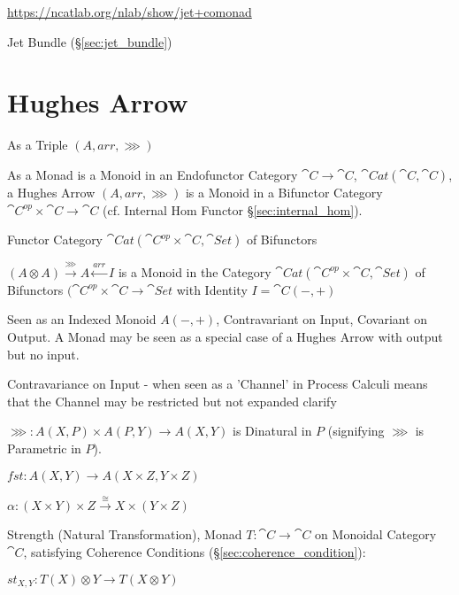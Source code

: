 \url{https://ncatlab.org/nlab/show/jet+comonad}

\fist Jet Bundle (\S\ref{sec:jet_bundle})



\section{Hughes Arrow}\label{sec:hughes_arrow}

As a Triple $(A, arr, \ggg)$

As a Monad is a Monoid in an Endofunctor Category $\cat{C} \rightarrow
\cat{C}$, $\cat{Cat}(\cat{C},\cat{C})$, a Hughes Arrow $(A, arr,
\ggg)$ is a Monoid in a Bifunctor Category $\cat{C}^{op} \times
\cat{C} \rightarrow \cat{C}$ (cf. Internal Hom Functor
\S\ref{sec:internal_hom}).

Functor Category $\cat{Cat}(\cat{C}^{op} \times \cat{C},
\cat{Set})$ of Bifunctors

$(A \otimes A) \xrightarrow{\ggg} A \xleftarrow{arr} I$ is a Monoid in
the Category $\cat{Cat} (\cat{C}^{op} \times \cat{C}, \cat{Set})$ of
Bifunctors $(\cat{C}^{op} \times \cat{C} \rightarrow \cat{Set}$ with
Identity $I = \cat{C} (-,+)$

Seen as an Indexed Monoid $A(-,+)$, Contravariant on Input, Covariant
on Output. A Monad may be seen as a special case of a Hughes Arrow
with output but no input.

Contravariance on Input - when seen as a 'Channel' in Process Calculi
means that the Channel may be restricted but not expanded %
clarify

$\ggg : A(X,P) \times A(P,Y) \rightarrow A(X,Y)$ is Dinatural in $P$
(signifying $\ggg$ is Parametric in $P$). \cite{jacobs-heunen-hasuo09}

$fst : A(X,Y) \rightarrow A(X \times Z, Y \times Z)$

$\alpha : (X \times Y) \times Z
\xrightarrow{\cong} X \times (Y \times Z)$

Strength (Natural Transformation), Monad $T : \cat{C} \rightarrow
\cat{C}$ on Monoidal Category $\cat{C}$, satisfying Coherence
Conditions (\S\ref{sec:coherence_condition}):

$st_{X,Y} : T(X) \otimes Y \rightarrow T(X \otimes Y)$

